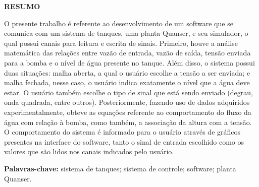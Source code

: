 \documentclass[a4paper,12pt]{article}
\begin{document}
\thispagestyle{empty}

\begin{center}
{\large \textbf{RESUMO}}
\end{center}

\vspace{3cm}

\begin{flushleft}

\hspace{4ex}O presente trabalho é referente ao desenvolvimento de um software que se comunica com um sistema de tanques, uma planta Quanser, e seu simulador, o qual possui canais para leitura e escrita de sinais. Primeiro, houve a análise matemática das relações entre vazão de entrada, vazão de saída, tensão enviada para a bomba e o nível de água presente no tanque. Além disso, o sistema possui duas situações: malha aberta, a qual o usuário escolhe a tensão a ser enviada; e malha fechada, nesse caso, o usuário indica exatamente o nível que a água deve estar. O usuário também escolhe o tipo de sinal que está sendo enviado (degrau, onda quadrada, entre outros). Posteriormente, fazendo uso de dados adquiridos experimentalmente, obteve as equações referente ao comportamento do fluxo da água com relação à bomba, como também, a associação da altura com a tensão. O comportamento do sistema é informado para o usuário através de gráficos presentes na interface do software, tanto o sinal de entrada escolhido como os valores que são lidos nos canais indicados pelo usuário.\\

\end{flushleft}

\vspace{1.5cm}

\textbf{Palavras-chave:} sistema de tanques; sistema de controle; software; planta Quanser.

\newpage


\thispagestyle{empty}

\begin{center}
\listoffigures
\end{center}

\newpage


\thispagestyle{empty}

\begin{center}
\tableofcontents
\end{center}
\end{document}
